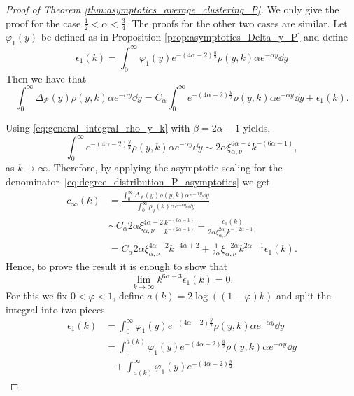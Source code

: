 \begin{proof}[Proof of Theorem \ref{thm:asymptotics_average_clustering_P}]

We only give the proof for the case $\frac{1}{2} < \alpha < \frac{3}{4}$. The proofs for the other two cases are similar. Let $\varphi_1(y)$ be defined as in Proposition \ref{prop:asymptotics_Delta_y_P} and define
\[
	\epsilon_1(k) = \int_0^{\infty} \varphi_1(y) e^{-(4\alpha - 2)\frac{y}{2}} \rho(y,k) \alpha e^{-\alpha y} \dd y
\]
Then we have that
\[
	\int_0^{\infty} \Delta_{\mathcal{P}}(y) \rho(y,k) \alpha e^{-\alpha y} \dd y
	= C_\alpha \int_0^{\infty} e^{-(4\alpha - 2)\frac{y}{2}} \rho(y,k) \alpha e^{-\alpha y} \dd y + \epsilon_1(k).
\]

Using \eqref{eq:general_integral_rho_y_k} with $\beta = 2\alpha - 1$ yields,
\begin{equation}\label{eq:asymptotics_clustering_integral}
	\int_0^{\infty} e^{-(4\alpha - 2)\frac{y}{2}} \rho(y,k) \alpha e^{-\alpha y} \dd y 
	\sim 2\alpha \xi_{\alpha,\nu}^{6\alpha - 2} k^{-(6\alpha - 1)},
\end{equation}
as $k \to \infty$. Therefore, by applying the asymptotic scaling for the denominator~\eqref{eq:degree_distribution_P_asymptotics} we get
\begin{align*}
	c_\infty(k) &= \frac{\int_0^{\infty} \Delta_{\mathcal{P}}(y) \rho(y,k) \alpha  e^{-\alpha y} \dd y}
		{\int_0^\infty \rho_{y}(k) \alpha e^{-\alpha y} \dd y} \\
	&\sim C_\alpha 2\alpha \xi_{\alpha,\nu}^{4\alpha - 2} \frac{k^{-(6\alpha - 1)}}{k^{-(2\alpha - 1)}}
	+ \frac{\epsilon_1(k)}{2\alpha \xi_{\alpha,\nu}^{2\alpha} k^{-(2\alpha - 1)}}\\
	&= C_\alpha 2\alpha \xi_{\alpha,\nu}^{4\alpha - 2} k^{-4\alpha + 2} 
    + \frac{1}{2\alpha}\xi_{\alpha,\nu}^{-2\alpha} k^{2\alpha - 1}\epsilon_1(k).
\end{align*}
Hence, to prove the result it is enough to show that
\[
	\lim_{k \to \infty} k^{6\alpha - 3}\epsilon_1(k) = 0.
\]
For this we fix $0 < \varphi < 1$, define $a(k) = 2\log((1-\varphi)k)$ and split the integral into two pieces
\begin{align*}
	\epsilon_1(k) &= \int_0^{\infty} \varphi_1(y) e^{-(4\alpha - 2)\frac{y}{2}} \rho(y,k) \alpha e^{-\alpha y} \dd y\\
	&= \int_0^{a(k)} \varphi_1(y) e^{-(4\alpha - 2)\frac{y}{2}} \rho(y,k) \alpha e^{-\alpha y} \dd y\\
	&\hspace{10pt}+ \int_{a(k)}^{\infty} \varphi_1(y) e^{-(4\alpha - 2)\frac{y}{2}} 

\end{align*}
\end{proof}
